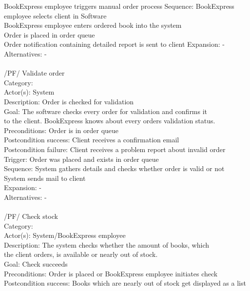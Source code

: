 \documentclass[11pt,a4paper,oneside,svgnames,draft]{report}
\begin{document}
\begin{tabbing}
	 \> BookExpress employee triggers manual order process
	 Sequence: \> BookExpress employee selects client in Software\\
	 \> BookExpress employee enters ordered book into the system\\
	 \> Order is placed in order queue\\
	 \> Order notification containing detailed report is sent to client
	 Expansion: \> -\\
	 Alternatives: \> -\\
	 \\
	 /PF/ \> Validate order\\ 
	 Category: \> \\
	 Actor(s): \> System\\ 
	 Description: \> Order is checked for validation\\ 
	 Goal: \> The software checks every order for validation and confirms it\\
	 \> to the client. BookExpress knows about every orders validation status.\\
	 Preconditions: \> Order is in order queue\\
	 Postcondition success: \> Client receives a confirmation email\\
	 Postcondition failure: \> Client receives a problem report about invalid order\\
	 Trigger: \> Order was placed and exists in order queue\\
	 Sequence: \> System  gathers details and checks whether order is valid or not\\
	 \> System sends mail to client\\
	 Expansion: \> -\\
	 Alternatives: \> -\\
	 \\
	 /PF/ \> Check stock\\ 
	 Category: \> \\
	 Actor(s): \> System/BookExpress employee\\ 
	 Description: \> The system checks whether the amount of books, which\\
	 \> the client orders, is available or nearly out of stock.\\ 
	 Goal: \> Check succeeds\\
	 Preconditions: \> Order is placed or BookExpress employee initiates check\\
	 Postcondition success: \> Books which are nearly out of stock get displayed as a list\\

\end{tabbing}
\end{document}
